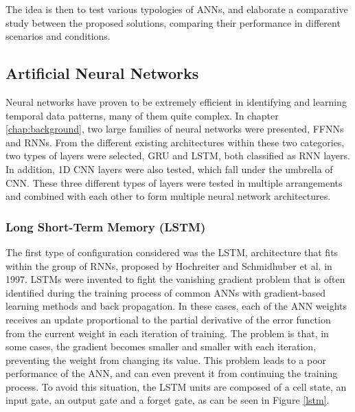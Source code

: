 The idea is then to test various typologies of \ac{ANN}s, and elaborate a comparative study between the proposed solutions, comparing their performance in different scenarios and conditions.

\subsection{Artificial Neural Networks}\label{chap3:subsec:artificial_neural_networks}

Neural networks have proven to be extremely efficient in identifying and learning temporal data patterns, many of them quite complex. In chapter \ref{chap:background}, two large families of neural networks were presented, \ac{FFNN}s and \ac{RNN}s. From the different existing architectures within these two categories, two types of layers were selected, \ac{GRU} and \ac{LSTM}, both classified as \ac{RNN} layers. In addition, \ac{1D CNN} layers were also tested, which fall under the umbrella of \ac{CNN}. These three different types of layers were tested in multiple arrangements and combined with each other to form multiple neural network architectures.

\subsubsection{Long Short-Term Memory (LSTM)}\label{chap3:subsubsec:lstm}

The first type of configuration considered was the \ac{LSTM}, architecture that fits within the group of \ac{RNN}s, proposed by Hochreiter and Schmidhuber et al. \cite{lstm0} in 1997. \ac{LSTM}s were invented to fight the vanishing gradient problem that is often identified during the training process of common \ac{ANN}s with gradient-based learning methods and back propagation. In these cases, each of the \ac{ANN} weights receives an update proportional to the partial derivative of the error function from the current weight in each iteration of training. The problem is that, in some cases, the gradient becomes smaller and smaller with each iteration, preventing the weight from changing its value. This problem leads to a poor performance of the \ac{ANN}, and can even prevent it from continuing the training process. To avoid this situation, the \ac{LSTM} units are composed of a cell state, an input gate, an output gate and a forget gate, as can be seen in Figure \ref{lstm}.

